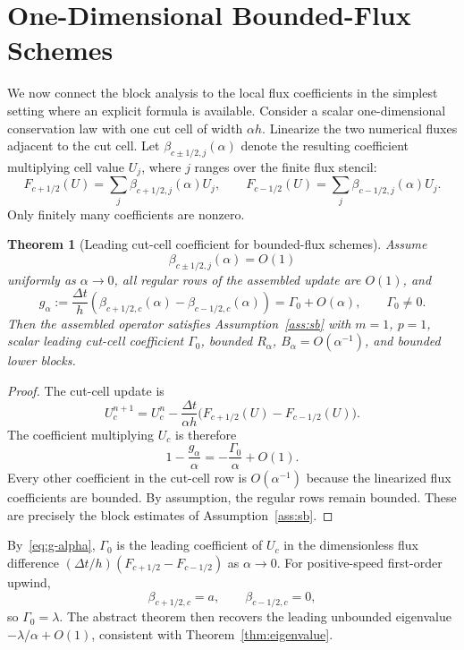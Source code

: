 \documentclass[preprint,12pt]{elsarticle}
\newtheorem{theorem}{Theorem}[section]
\begin{document}
\section{One-Dimensional Bounded-Flux Schemes}
\label{sec:verify}

We now connect the block analysis to the local flux coefficients in the
simplest setting where an explicit formula is available.  Consider a scalar
one-dimensional conservation law with one cut cell of width $\alpha h$.
Linearize the two numerical fluxes adjacent to the cut cell.  Let
$\beta_{c\pm1/2,j}(\alpha)$ denote the resulting coefficient multiplying cell
value $U_j$, where $j$ ranges over the finite flux stencil:
\begin{equation}
    F_{c+1/2}(U)
    =
    \sum_j \beta_{c+1/2,j}(\alpha)U_j,
    \qquad
    F_{c-1/2}(U)
    =
    \sum_j \beta_{c-1/2,j}(\alpha)U_j.
    \label{eq:linearized_flux}
\end{equation}
Only finitely many coefficients are nonzero.

\begin{theorem}[Leading cut-cell coefficient for bounded-flux schemes]
\label{thm:gamma_formula}
Assume
\[
    \beta_{c\pm1/2,j}(\alpha)=O(1)
\]
uniformly as $\alpha\to0$, all regular rows of the assembled update are
$O(1)$, and
\begin{equation}
    g_\alpha
    :=
    \frac{\Delta t}{h}
    \left(
      \beta_{c+1/2,c}(\alpha)-\beta_{c-1/2,c}(\alpha)
    \right)
    =
    \Gamma_0+O(\alpha),
    \qquad
    \Gamma_0\ne0.
    \label{eq:g-alpha}
\end{equation}
Then the assembled operator satisfies Assumption~\ref{ass:sb} with
$m=1$, $p=1$, scalar leading cut-cell coefficient $\Gamma_0$, bounded
$R_\alpha$, $B_\alpha=O(\alpha^{-1})$, and bounded lower blocks.
\end{theorem}

\begin{proof}
The cut-cell update is
\[
 U_c^{n+1}
 =
 U_c^n
 -
 \frac{\Delta t}{\alpha h}
 \bigl(F_{c+1/2}(U)-F_{c-1/2}(U)\bigr).
\]
The coefficient multiplying $U_c$ is therefore
\[
    1-\frac{g_\alpha}{\alpha}
    =
    -\frac{\Gamma_0}{\alpha}+O(1).
\]
Every other coefficient in the cut-cell row is $O(\alpha^{-1})$ because the
linearized flux coefficients are bounded.  By assumption, the regular rows
remain bounded.  These are precisely the block estimates of
Assumption~\ref{ass:sb}.
\end{proof}

By~\eqref{eq:g-alpha}, $\Gamma_0$ is the leading coefficient of $U_c$ in
the dimensionless flux difference
$(\Delta t/h)(F_{c+1/2}-F_{c-1/2})$ as $\alpha\to0$.
For positive-speed first-order upwind,
\[
    \beta_{c+1/2,c}=a,\qquad \beta_{c-1/2,c}=0,
\]
so $\Gamma_0=\lambda$.  The abstract theorem then recovers the leading
unbounded eigenvalue $-\lambda/\alpha+O(1)$, consistent with
Theorem~\ref{thm:eigenvalue}.
\end{document}
